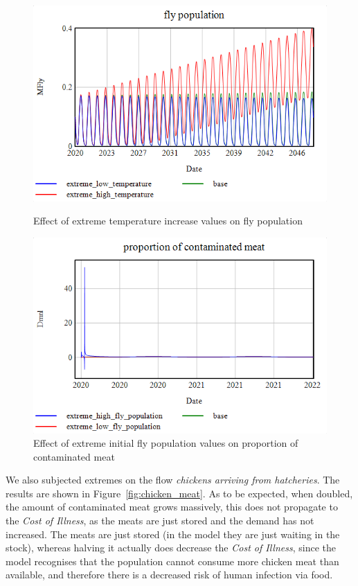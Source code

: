 \begin{figure}[h!]
    \centering
    \begin{minipage}{0.45\textwidth}
        \centering
        \includegraphics[width=\textwidth]{images/extremes/Temperature_fly_population.png} 
        \caption{Effect of extreme temperature increase values on fly population}
        \label{fig:temp_fly}
    \end{minipage}
    \begin{minipage}{0.45\textwidth}
        \centering
        \includegraphics[width=\textwidth]{images/extremes/Fly_population_contaminated_meat.png} 
        \caption{Effect of extreme initial fly population values on proportion of contaminated meat}
        \label{fig:fly_meat}
    \end{minipage}
\end{figure}

We also subjected extremes on the flow \textit{chickens arriving from hatcheries}. The results are shown in Figure~\ref{fig:chicken_meat}. As to be expected, when doubled, the amount of contaminated meat grows massively, this does not propagate to the \textit{Cost of Illness}, as the meats are just stored and the demand has not increased. The meats are just stored (in the model they are just waiting in the stock), whereas halving it actually does decrease the \textit{Cost of Illness}, since the model recognises that the population cannot consume more chicken meat than available, and therefore there is a decreased risk of human infection via food. 


